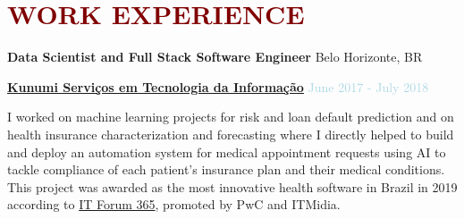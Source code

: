 

\section*{\textcolor{maroon}{\normalsize WORK EXPERIENCE}}







\textbf{Data Scientist and Full Stack Software Engineer} \hfill {Belo Horizonte, BR}
\begin{outerlist}

\item[] \href{https://kunumi.com}{\textbf{Kunumi Serviços em Tecnologia da Informação}}  \hfill {\textcolor{lightblue}{June 2017 - July 2018}} \medskip 

        \begin{innerlist}[-]
        \item I worked on machine learning projects for risk and loan default prediction and on health insurance characterization and forecasting where I directly helped to build and deploy an automation system for medical appointment requests using AI to tackle compliance of each patient's insurance plan and their medical conditions. This project was awarded as the most innovative health software in Brazil in 2019 according to \href{https://itforum365.com.br/inteligencia-artificial-apoia-trabalho-de-medicos-na-unimed-bh/}{IT Forum 365}, promoted by PwC and ITMidia.
        \end{innerlist}

\end{outerlist}

